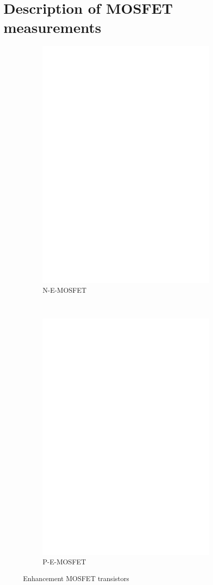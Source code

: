 \chapter{Description of  MOSFET measurements}
\label{sec:MOSmeasurements}

\begin{figure}[H]
  \begin{subfigure}[b]{9cm}
    \centering
    \includegraphics[width=9cm]{../FIG/MOS_BUZ71.eps}
    \caption{N-E-MOSFET}
    \label{fig:MOS-N-E}
  \end{subfigure}
  ~
  \begin{subfigure}[b]{9cm}
    \centering
    \includegraphics[width=9cm]{../FIG/MOS_IRF5305.eps}
    \caption{P-E-MOSFET}
    \label{fig:MOS-P-E}
  \end{subfigure}
  \caption{Enhancement MOSFET transistors}
\end{figure}



